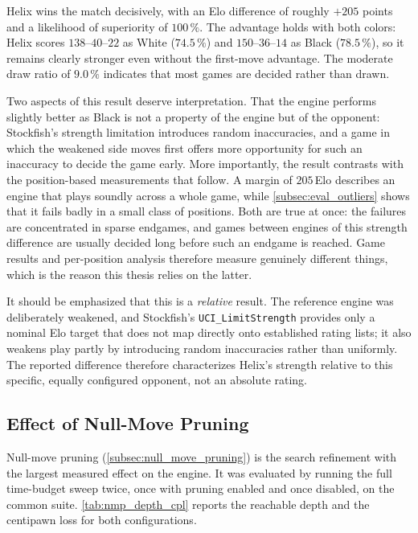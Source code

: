 Helix wins the match decisively, with an Elo difference of roughly $+205$ points
and a likelihood of superiority of $100\,\%$. The advantage holds with both
colors: Helix scores $138$--$40$--$22$ as White ($74.5\,\%$) and
$150$--$36$--$14$ as Black ($78.5\,\%$), so it remains clearly stronger even
without the first-move advantage. The moderate draw ratio of $9.0\,\%$ indicates
that most games are decided rather than drawn.

Two aspects of this result deserve interpretation. That the engine performs
slightly better as Black is not a property of the engine but of the opponent:
Stockfish's strength limitation introduces random inaccuracies, and a game in
which the weakened side moves first offers more opportunity for such an
inaccuracy to decide the game early. More importantly, the result contrasts with
the position-based measurements that follow. A margin of $205$\,Elo describes an
engine that plays soundly across a whole game, while
\cref{subsec:eval_outliers} shows that it fails badly in a small class of
positions. Both are true at once: the failures are concentrated in sparse
endgames, and games between engines of this strength difference are usually
decided long before such an endgame is reached. Game results and per-position
analysis therefore measure genuinely different things, which is the reason this
thesis relies on the latter.

It should be emphasized that this is a \emph{relative} result. The reference
engine was deliberately weakened, and Stockfish's \texttt{UCI\_LimitStrength}
provides only a nominal Elo target that does not map directly onto established
rating lists; it also weakens play partly by introducing random inaccuracies
rather than uniformly. The reported difference therefore characterizes Helix's
strength relative to this specific, equally configured opponent, not an absolute
rating.

\subsection{Effect of Null-Move Pruning}
\label{subsec:eval_nmp}

Null-move pruning (\cref{subsec:null_move_pruning}) is the search refinement with
the largest measured effect on the engine. It was evaluated by running the full
time-budget sweep twice, once with pruning enabled and once disabled, on the
common suite. \cref{tab:nmp_depth_cpl} reports the reachable depth and the
centipawn loss for both configurations.

